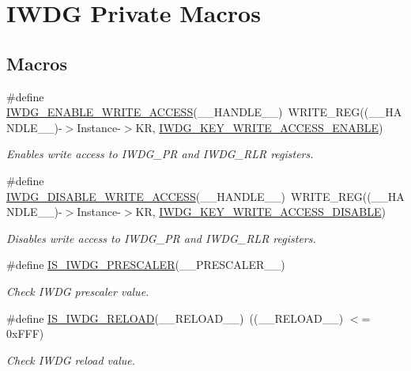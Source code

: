 \hypertarget{group___i_w_d_g___private___macro}{\section{I\-W\-D\-G Private Macros}
\label{group___i_w_d_g___private___macro}
}
\subsection*{Macros}
\begin{DoxyCompactItemize}
\item 
\#define \hyperlink{group___i_w_d_g___private___macro_ga65cf77f3cfd45d3fd66c0cf33d23d7ab}{I\-W\-D\-G\-\_\-\-E\-N\-A\-B\-L\-E\-\_\-\-W\-R\-I\-T\-E\-\_\-\-A\-C\-C\-E\-S\-S}(\-\_\-\-\_\-\-H\-A\-N\-D\-L\-E\-\_\-\-\_\-)~W\-R\-I\-T\-E\-\_\-\-R\-E\-G((\-\_\-\-\_\-\-H\-A\-N\-D\-L\-E\-\_\-\-\_\-)-\/$>$Instance-\/$>$K\-R, \hyperlink{group___i_w_d_g___private___defines_ga90fbb0a5e42ed25b44c0330ad75724e6}{I\-W\-D\-G\-\_\-\-K\-E\-Y\-\_\-\-W\-R\-I\-T\-E\-\_\-\-A\-C\-C\-E\-S\-S\-\_\-\-E\-N\-A\-B\-L\-E})
\begin{DoxyCompactList}\small\item\em Enables write access to I\-W\-D\-G\-\_\-\-P\-R and I\-W\-D\-G\-\_\-\-R\-L\-R registers. \end{DoxyCompactList}\item 
\#define \hyperlink{group___i_w_d_g___private___macro_ga31636a55162fc73caf03c2d2808ea9dd}{I\-W\-D\-G\-\_\-\-D\-I\-S\-A\-B\-L\-E\-\_\-\-W\-R\-I\-T\-E\-\_\-\-A\-C\-C\-E\-S\-S}(\-\_\-\-\_\-\-H\-A\-N\-D\-L\-E\-\_\-\-\_\-)~W\-R\-I\-T\-E\-\_\-\-R\-E\-G((\-\_\-\-\_\-\-H\-A\-N\-D\-L\-E\-\_\-\-\_\-)-\/$>$Instance-\/$>$K\-R, \hyperlink{group___i_w_d_g___private___defines_ga9e63bed9af448ad96c4621e74230a415}{I\-W\-D\-G\-\_\-\-K\-E\-Y\-\_\-\-W\-R\-I\-T\-E\-\_\-\-A\-C\-C\-E\-S\-S\-\_\-\-D\-I\-S\-A\-B\-L\-E})
\begin{DoxyCompactList}\small\item\em Disables write access to I\-W\-D\-G\-\_\-\-P\-R and I\-W\-D\-G\-\_\-\-R\-L\-R registers. \end{DoxyCompactList}\item 
\#define \hyperlink{group___i_w_d_g___private___macro_ga2b1af237dca5c067fbc9088185cb8185}{I\-S\-\_\-\-I\-W\-D\-G\-\_\-\-P\-R\-E\-S\-C\-A\-L\-E\-R}(\-\_\-\-\_\-\-P\-R\-E\-S\-C\-A\-L\-E\-R\-\_\-\-\_\-)
\begin{DoxyCompactList}\small\item\em Check I\-W\-D\-G prescaler value. \end{DoxyCompactList}\item 
\#define \hyperlink{group___i_w_d_g___private___macro_gad7ade0982243f56ba89ff764534f553c}{I\-S\-\_\-\-I\-W\-D\-G\-\_\-\-R\-E\-L\-O\-A\-D}(\-\_\-\-\_\-\-R\-E\-L\-O\-A\-D\-\_\-\-\_\-)~((\-\_\-\-\_\-\-R\-E\-L\-O\-A\-D\-\_\-\-\_\-) $<$= 0x\-F\-F\-F)
\begin{DoxyCompactList}\small\item\em Check I\-W\-D\-G reload value. \end{DoxyCompactList}\end{DoxyCompactItemize}


